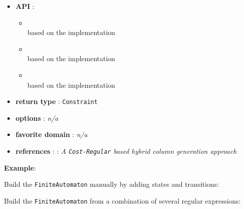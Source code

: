 \begin{itemize}
	\item \textbf{API} :
	\begin{itemize}
		\item {}\\
based on the   implementation
		\item {}\\
based on the   implementation
		\item {}\\
based on the   implementation
	\end{itemize}
	\item \textbf{return type} : \texttt{Constraint}
	\item \textbf{options} : \emph{n/a}
	\item \textbf{favorite domain} : \emph{n/a}
	\item \textbf{references} : \cite{DemasseyC06}: \emph{A \texttt{Cost-Regular} based hybrid column generation approach}
\end{itemize}



\textbf{Example}:

Build the \texttt{FiniteAutomaton} manually by adding states and transitions:


Build the \texttt{FiniteAutomaton} from a combination of several regular expressions: 

